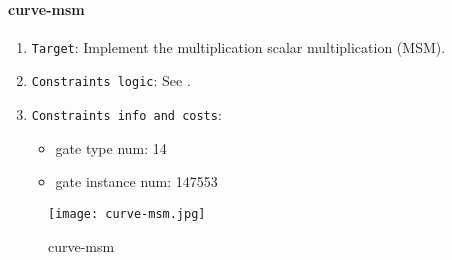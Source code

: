 \paragraph{curve-msm}

\begin{enumerate}
    \item \verb|Target|: Implement the multiplication scalar multiplication (MSM).
    \item \verb|Constraints logic|: See .
    \item \verb|Constraints info and costs|:
    \begin{itemize}
        \item gate type num: 14
        \item gate instance num: 147553
    \end{itemize}
\end{enumerate}

\begin{figure}[!ht]
    \centering
    \texttt{[image: curve-msm.jpg]}
    \caption{curve-msm}
    \label{fig:curve-msm}
\end{figure}